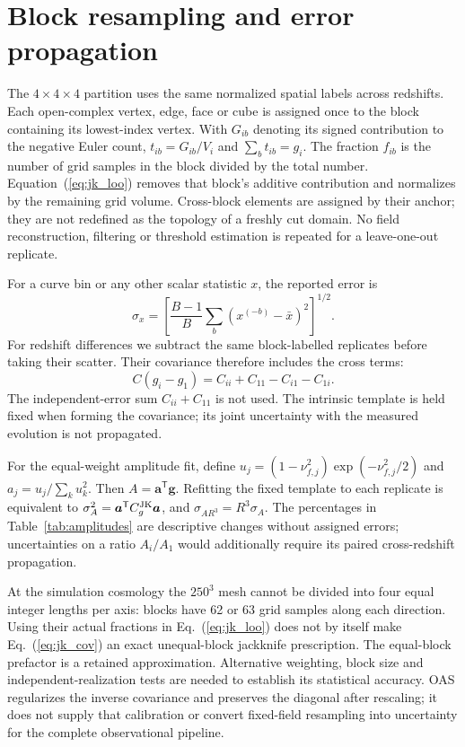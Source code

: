 \section{Block resampling and error propagation}\label{app:jackknife}
The $4\times4\times4$ partition uses the same normalized spatial labels across redshifts. Each open-complex vertex, edge, face or cube is assigned once to the block containing its lowest-index vertex. With $G_{ib}$ denoting its signed contribution to the negative Euler count, $t_{ib}=G_{ib}/V_i$ and $\sum_b t_{ib}=g_i$. The fraction $f_{ib}$ is the number of grid samples in the block divided by the total number. Equation~(\ref{eq:jk_loo}) removes that block's additive contribution and normalizes by the remaining grid volume. Cross-block elements are assigned by their anchor; they are not redefined as the topology of a freshly cut domain. No field reconstruction, filtering or threshold estimation is repeated for a leave-one-out replicate.

For a curve bin or any other scalar statistic $x$, the reported error is
\begin{equation}
\sigma_x=\left[\frac{B-1}{B}\sum_b(x^{(-b)}-\bar x)^2\right]^{1/2}.
\end{equation}
For redshift differences we subtract the same block-labelled replicates before taking their scatter. Their covariance therefore includes the cross terms:
\begin{equation}
C(g_i-g_1)=C_{ii}+C_{11}-C_{i1}-C_{1i}.
\end{equation}
The independent-error sum $C_{ii}+C_{11}$ is not used. The intrinsic template is held fixed when forming the covariance; its joint uncertainty with the measured evolution is not propagated.

For the equal-weight amplitude fit, define $u_j=(1-\nu_{f,j}^2)\exp(-\nu_{f,j}^2/2)$ and $a_j=u_j/\sum_k u_k^2$. Then $A=\boldsymbol a^{\mathsf T}\boldsymbol g$. Refitting the fixed template to each replicate is equivalent to $\sigma_A^2=\boldsymbol a^{\mathsf T}C_g^{\rm JK}\boldsymbol a$, and $\sigma_{AR^3}=R^3\sigma_A$. The percentages in Table~\ref{tab:amplitudes} are descriptive changes without assigned errors; uncertainties on a ratio $A_i/A_1$ would additionally require its paired cross-redshift propagation.

At the simulation cosmology the $250^3$ mesh cannot be divided into four equal integer lengths per axis: blocks have 62 or 63 grid samples along each direction. Using their actual fractions in Eq.~(\ref{eq:jk_loo}) does not by itself make Eq.~(\ref{eq:jk_cov}) an exact unequal-block jackknife prescription. The equal-block prefactor is a retained approximation. Alternative weighting, block size and independent-realization tests are needed to establish its statistical accuracy. OAS regularizes the inverse covariance and preserves the diagonal after rescaling; it does not supply that calibration or convert fixed-field resampling into uncertainty for the complete observational pipeline.

